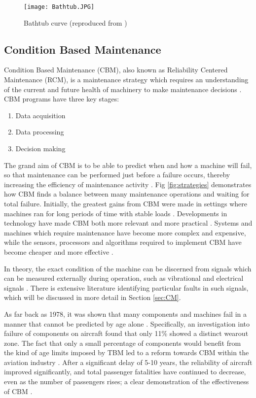 \begin{figure}
    \centering
    \texttt{[image: Bathtub.JPG]}
    \caption{Bathtub curve (reproduced from \cite{CBM_time_prevent})}
    \label{fig:bathtub}
\end{figure}

\subsection{Condition Based Maintenance}

Condition Based Maintenance (CBM), also known as Reliability Centered Maintenance (RCM), is a maintenance strategy which requires an understanding of the current and future health of machinery to make maintenance decisions \cite{CBM_overview}.
CBM programs have three key stages:
\begin{enumerate}
    \item Data acquisition
    \item Data processing
    \item Decision making
\end{enumerate}
The grand aim of CBM is to be able to predict when and how a machine will fail, so that maintenance can be performed just before a failure occurs, thereby increasing the efficiency of maintenance activity \cite{CBM_overview}.
Fig \ref{fig:strategies} demonstrates how CBM finds a balance between many maintenance operations and waiting for total failure.
Initially, the greatest gains from CBM were made in settings where machines ran for long periods of time with stable loads \cite{CM_randall}.
Developments in technology have made CBM both more relevant and more practical \cite{CBM_overview}\cite{CBM_norway_bd}.
Systems and machines which require maintenance have become more complex and expensive, while the sensors, processors and algorithms required to implement CBM have become cheaper and more effective \cite{CBM_norway_bd}.
\par

In theory, the exact condition of the machine can be discerned from signals which can be measured externally during operation, such as vibrational and electrical signals \cite{CBM_overview}.
There is extensive literature identifying particular faults in such signals, which will be discussed in more detail in Section \ref{sec:CM}.
\par

As far back as 1978, it was shown that many components and machines fail in a manner that cannot be predicted by age alone \cite{RCM}.
Specifically, an investigation into failure of components on aircraft found that only 11\% showed a distinct wearout zone.
The fact that only a small percentage of components would benefit from the kind of age limits imposed by TBM led to a reform towards CBM within the aviation industry \cite{RCM}.
After a significant delay of 5-10 years, the reliability of aircraft improved significantly, and total passenger fatalities have continued to decrease, even as the number of passengers rises; a clear demonstration of the effectiveness of CBM \cite{CBM_beyond_maritime}.

